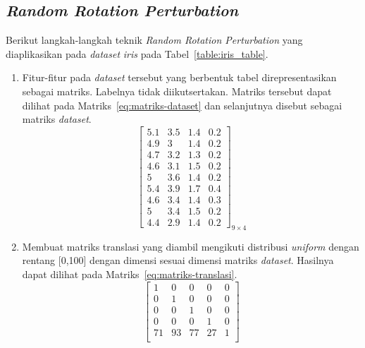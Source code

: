 \subsection{\textit{Random Rotation Perturbation}}
\label{subsec:studi-rrp}

Berikut langkah-langkah teknik \textit{Random Rotation Perturbation} yang diaplikasikan pada \textit{dataset} \textit{iris} pada Tabel~\ref{table:iris_table}.
\begin{enumerate}
    \item Fitur-fitur pada \textit{dataset} tersebut yang berbentuk tabel direpresentasikan sebagai matriks. Labelnya tidak diikutsertakan. Matriks tersebut dapat dilihat pada Matriks~\ref{eq:matriks-dataset} dan selanjutnya disebut sebagai matriks \textit{dataset}.
    \begin{equation}\label{eq:matriks-dataset}
        \begin{bmatrix}
        5.1		&		3.5		&		1.4		&		0.2	\\
        4.9		&		3		&		1.4		&		0.2	\\
        4.7		&		3.2		&		1.3		&		0.2	\\
        4.6		&		3.1		&		1.5		&		0.2	\\
        5		&		3.6		&		1.4		&		0.2	\\
        5.4		&		3.9		&		1.7		&		0.4	\\
        4.6		&		3.4		&		1.4		&		0.3	\\
        5		&		3.4		&		1.5		&		0.2	\\
        4.4		&		2.9		&		1.4		&		0.2 
        \end{bmatrix}_{9\times 4}
    \end{equation}
    \item Membuat matriks translasi yang diambil mengikuti distribusi \textit{uniform} dengan rentang [0,100] dengan dimensi sesuai dimensi matriks \textit{dataset}. Hasilnya dapat dilihat pada Matriks~\ref{eq:matriks-translasi}.
    \begin{equation}\label{eq:matriks-translasi}
        \begin{bmatrix}
            1				&		0				&		0				&		0			&		0 \\
            0				&		1				&		0				&		0			&		0 \\
            0				&		0				&		1				&		0			&		0 \\
            0				&		0				&		0				&		1 			&		0 \\
            71		&		93		&		77		&		27 &		1 \\

\end{bmatrix}
\end{equation}
\end{enumerate}
